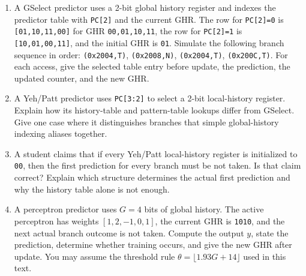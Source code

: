\begin{enumerate}
    \item A GSelect predictor uses a 2-bit global history register and indexes the predictor table with \texttt{PC[2]} and the current GHR. The row for \texttt{PC[2]=0} is \texttt{[01,10,11,00]} for GHR \texttt{00,01,10,11}, the row for \texttt{PC[2]=1} is \texttt{[10,01,00,11]}, and the initial GHR is \texttt{01}.
    Simulate the following branch sequence in order: \texttt{(0x2004,T)}, \texttt{(0x2008,N)}, \texttt{(0x2004,T)}, \texttt{(0x200C,T)}.
    For each access, give the selected table entry before update, the prediction, the updated counter, and the new GHR\@.
    \item A Yeh/Patt predictor uses \texttt{PC[3:2]} to select a 2-bit local-history register.
    Explain how its history-table and pattern-table lookups differ from GSelect.
    Give one case where it distinguishes branches that simple global-history indexing aliases together.
    \item A student claims that if every Yeh/Patt local-history register is initialized to \texttt{00}, then the first prediction for every branch must be not taken.
    Is that claim correct?
    Explain which structure determines the actual first prediction and why the history table alone is not enough.
    \item A perceptron predictor uses $G=4$ bits of global history.
    The active perceptron has weights $[1,2,-1,0,1]$, the current GHR is \texttt{1010}, and the next actual branch outcome is not taken.
    Compute the output $y$, state the prediction, determine whether training occurs, and give the new GHR after update.
    You may assume the threshold rule $\theta=\lfloor 1.93G+14\rfloor$ used in this text.
\end{enumerate}
